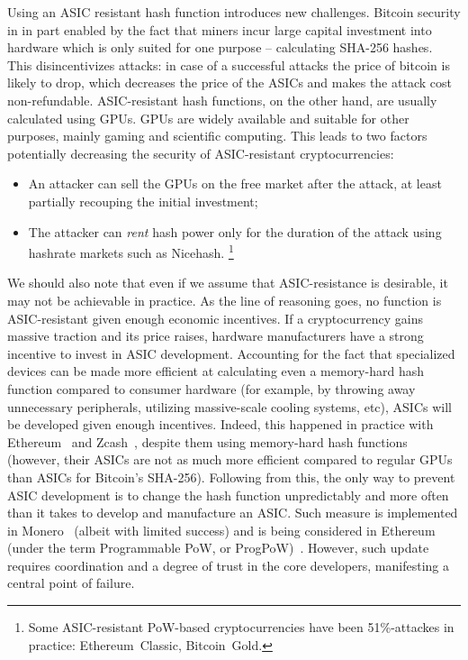 Using an ASIC resistant hash function introduces new challenges.
Bitcoin security in in part enabled by the fact that miners incur large capital investment into hardware which is only suited for one purpose -- calculating SHA-256 hashes.
This disincentivizes attacks: in case of a successful attacks the price of bitcoin is likely to drop, which decreases the price of the ASICs and makes the attack cost non-refundable.
ASIC-resistant hash functions, on the other hand, are usually calculated using GPUs.
GPUs are widely available and suitable for other purposes, mainly gaming and scientific computing.
This leads to two factors potentially decreasing the security of ASIC-resistant cryptocurrencies:
\begin{itemize}
	\item An attacker can sell the GPUs on the free market after the attack, at least partially recouping the initial investment;
	\item The attacker can \textit{rent} hash power only for the duration of the attack using hashrate markets such as Nicehash. \footnote{Some ASIC-resistant PoW-based cryptocurrencies have been 51\%-attackes in practice: Ethereum~Classic, Bitcoin~Gold.}
\end{itemize}
We should also note that even if we assume that ASIC-resistance is desirable, it may not be achievable in practice.
As the line of reasoning goes, no function is ASIC-resistant given enough economic incentives.
If a cryptocurrency gains massive traction and its price raises, hardware manufacturers have a strong incentive to invest in ASIC development.
Accounting for the fact that specialized devices can be made more efficient at calculating even a memory-hard hash function compared to consumer hardware (for example, by throwing away unnecessary peripherals, utilizing massive-scale cooling systems, etc), ASICs will be developed given enough incentives.
Indeed, this happened in practice with Ethereum~\cite{OLeary2018} and Zcash~\cite{Floyd2018}, despite them using memory-hard hash functions (however, their ASICs are not as much more efficient compared to regular GPUs than ASICs for Bitcoin's SHA-256).
Following from this, the only way to prevent ASIC development is to change the hash function unpredictably and more often than it takes to develop and manufacture an ASIC.
Such measure is implemented in Monero~\cite{Kim2019} (albeit with limited success) and is being considered in Ethereum (under the term Programmable PoW, or ProgPoW)~\cite{OLeary2019}.
However, such update requires coordination and a degree of trust in the core developers, manifesting a central point of failure.

